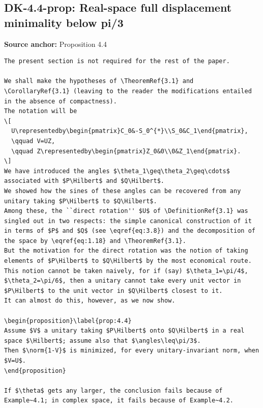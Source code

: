 \subsection*{DK-4.4-prop: Real-space full displacement minimality below pi/3}
\noindent\textbf{Source anchor:} Proposition 4.4\\
\begin{verbatim}
The present section is not required for the rest of the paper.

We shall make the hypotheses of \TheoremRef{3.1} and \CorollaryRef{3.1} (leaving to the reader the modifications entailed in the absence of compactness).
The notation will be
\[
  U\representedby\begin{pmatrix}C_0&-S_0^{*}\\S_0&C_1\end{pmatrix},
  \qquad V=UZ,
  \qquad Z\representedby\begin{pmatrix}Z_0&0\\0&Z_1\end{pmatrix}.
\]
We have introduced the angles $\theta_1\geq\theta_2\geq\cdots$ associated with $P\Hilbert$ and $Q\Hilbert$.
We showed how the sines of these angles can be recovered from any unitary taking $P\Hilbert$ to $Q\Hilbert$.
Among these, the ``direct rotation'' $U$ of \DefinitionRef{3.1} was singled out in two respects: the simple canonical construction of it in terms of $P$ and $Q$ (see \eqref{eq:3.8}) and the decomposition of the space by \eqref{eq:1.18} and \TheoremRef{3.1}.
But the motivation for the direct rotation was the notion of taking elements of $P\Hilbert$ to $Q\Hilbert$ by the most economical route.
This notion cannot be taken naively, for if (say) $\theta_1=\pi/4$, $\theta_2=\pi/6$, then a unitary cannot take every unit vector in $P\Hilbert$ to the unit vector in $Q\Hilbert$ closest to it.
It can almost do this, however, as we now show.

\begin{proposition}\label{prop:4.4}
Assume $V$ a unitary taking $P\Hilbert$ onto $Q\Hilbert$ in a real space $\Hilbert$; assume also that $\angles\leq\pi/3$.
Then $\norm{1-V}$ is minimized, for every unitary-invariant norm, when $V=U$.
\end{proposition}

If $\theta$ gets any larger, the conclusion fails because of Example~4.1; in complex space, it fails because of Example~4.2.
\end{verbatim}

